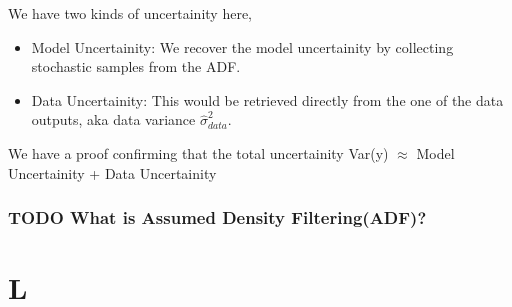 \documentclass[a4paper]{article}
\begin{document}
We have two kinds of uncertainity here,

\begin{itemize}
\item Model Uncertainity: We recover the model uncertainity by collecting stochastic samples from the ADF.

\item Data Uncertainity: This would be retrieved directly from the one of the data outputs, aka data variance \( \hat{\sigma}^2_{data} \).
\end{itemize}

We have a proof confirming that the total uncertainity Var(y) $\approx$ Model Uncertainity + Data Uncertainity


\subsubsection*{{\bfseries\sffamily TODO} What is Assumed Density Filtering(ADF)?}
\label{sec-5-1-1}




\section{L}
\label{sec-6}
\printbibliography
\end{document}
